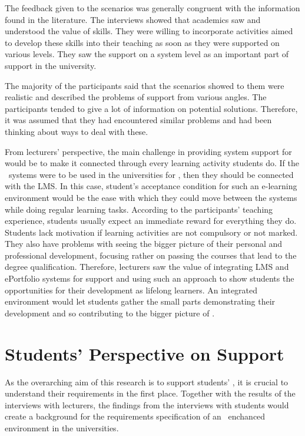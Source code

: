 The feedback given to the scenarios was generally congruent with the information
found in the literature. The interviews showed that academics saw and understood
the value of \LLLs skills. They were willing to incorporate activities aimed to
develop these skills into their teaching as soon as they were supported on
various levels. They saw the support on a system level as an important part of
\LLLs support in the university.

The majority of the participants said that the scenarios showed to them were
realistic and described the problems of \LLLs support from various angles. The
participants tended to give a lot of information on potential solutions.
Therefore, it was assumed that they had encountered similar problems and had
been thinking about ways to deal with these.

From lecturers' perspective, the main challenge in providing system support for
\LLLs would be to make it connected through every learning activity students do.
If the \ep~systems were to be used in the universities for \LLLs, then they
should be connected with the LMS. In this case, student's acceptance condition
for such an e-learning environment would be the ease with which they could move
between the systems while doing regular learning tasks. According to the
participants' teaching experience, students usually expect an immediate reward
for everything they do. Students lack motivation if learning activities are not
compulsory or not marked. They also have problems with seeing the bigger picture
of their personal and professional development, focusing rather on passing the
courses that lead to the degree qualification. Therefore, lecturers saw the
value of integrating LMS and ePortfolio systems for \LLLs support and using such
an approach to show students the opportunities for their development as lifelong
learners. An integrated environment would let students gather the small parts
demonstrating their development and so contributing to the bigger picture of
\LLLsn.

\section{Students' Perspective on \LLLc Support}

As the overarching aim of this research is to support students' \LLLsn, it is
crucial to understand their requirements in the first place. Together with the
results of the interviews with lecturers, the findings from the interviews with
students would create a background for the requirements specification of an
\ep~enchanced environment in the universities.

